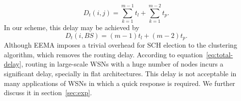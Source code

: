 \documentclass[journal]{IEEEtran}
\begin{document}
\begin{equation}
\label{eq:total-delay}
D_{t}(i,j)= \sum_{k=1}^{m-1}t_{l} + \sum_{k=1}^{m-2}t_{p}.
\end{equation}
In our scheme, this delay may be achieved by
\begin{equation}
\label{eq:tot-delay}
D_{t}(i,BS)=(m-1)t_{l} + (m-2)t_{p}.
\end{equation}
Although EEMA imposes a trivial overhead for SCH election to the clustering algorithm, which removes the routing delay.  According to equation~\eqref{eq:total-delay}, routing in large-scale WSNs with a huge number of nodes incurs a significant delay, specially in flat architectures.  This delay is not acceptable in many applications of WSNs in which a quick response is required.  We further discuss it in section~\ref{sec:exp}. 
\end{document}
